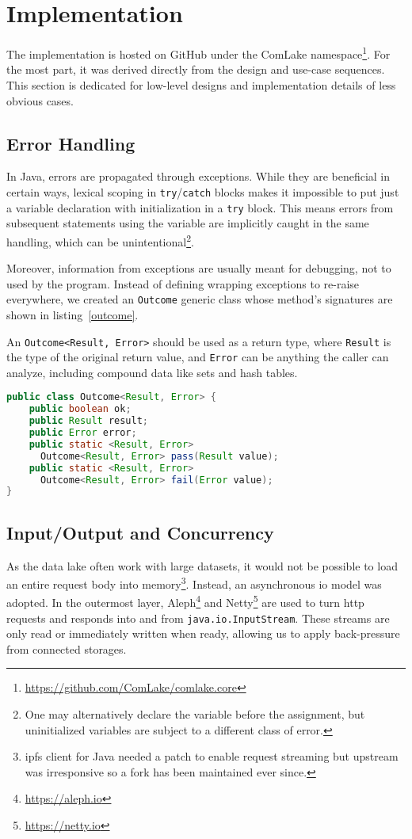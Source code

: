\section{Implementation}
The implementation is hosted on GitHub under the ComLake
namespace\footnote{\url{https://github.com/ComLake/comlake.core}}.
For the most part, it was derived directly from the design
and use-case sequences.  This section is dedicated for low-level designs
and implementation details of less obvious cases.

\subsection{Error Handling}
In Java, errors are propagated through exceptions.  While they are beneficial
in certain ways, lexical scoping in \verb|try|/\verb|catch| blocks makes it
impossible to put just a variable declaration with initialization in
a \verb|try| block.  This means errors from subsequent statements using
the variable are implicitly caught in the same handling, which can
be unintentional\footnote{One may alternatively declare the variable before
the assignment, but uninitialized variables are subject to a different
class of error.}.

Moreover, information from exceptions are usually meant for debugging,
not to used by the program.  Instead of defining wrapping exceptions
to re-raise everywhere, we created an \verb|Outcome| generic class
whose method's signatures are shown in listing~\ref{outcome}.

An \verb|Outcome<Result, Error>| should be used as a return type,
where \verb|Result| is the type of the original return value, and \verb|Error|
can be anything the caller can analyze, including compound data like sets
and hash tables.

\begin{lstlisting}[label=outcome,caption=Generic outcome type
  for replacing exceptions,language=java]
public class Outcome<Result, Error> {
    public boolean ok;
    public Result result;
    public Error error;
    public static <Result, Error>
      Outcome<Result, Error> pass(Result value);
    public static <Result, Error>
      Outcome<Result, Error> fail(Error value);
}
\end{lstlisting}

\subsection{Input/Output and Concurrency}\label{future}
As the data lake often work with large datasets, it would not be possible
to load an entire request body into memory\footnote{\gls{ipfs} client for Java
needed a patch to enable request streaming but upstream was irresponsive so a
fork has been maintained ever since.}.  Instead, an asynchronous \gls{io} model
was adopted.  In the outermost layer, Aleph\footnote{\url{https://aleph.io}}
and Netty\footnote{\url{https://netty.io}} are used to turn \gls{http}
requests and responds into and from \verb|java.io.InputStream|.  These streams
are only read or immediately written when ready, allowing us to apply
back-pressure from connected storages.

